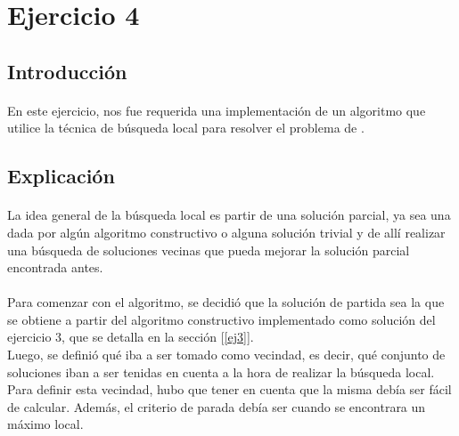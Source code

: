 \section{Ejercicio 4}

\subsection{Introducción}
\paragraph{}
En este ejercicio, nos fue requerida una implementación de un algoritmo que utilice la técnica de búsqueda local para resolver el problema de \mc.

\subsection{Explicación}

\paragraph{}
La idea general de la búsqueda local es partir de una solución parcial, ya sea una dada por algún algoritmo constructivo o alguna solución trivial y de allí realizar una búsqueda de soluciones vecinas que pueda mejorar la solución parcial encontrada antes.

\paragraph{}
Para comenzar con el algoritmo, se decidió que la solución de partida sea la que se obtiene a partir del algoritmo constructivo implementado como solución del ejercicio 3, que se detalla en la sección [\ref{ej3}].\\
Luego, se definió qué iba a ser tomado como vecindad, es decir, qué conjunto de soluciones iban a ser tenidas en cuenta a la hora de realizar la búsqueda local. Para definir esta vecindad, hubo que tener en cuenta que la misma debía ser fácil de calcular. Además, el criterio de parada debía ser cuando se encontrara un máximo local.


